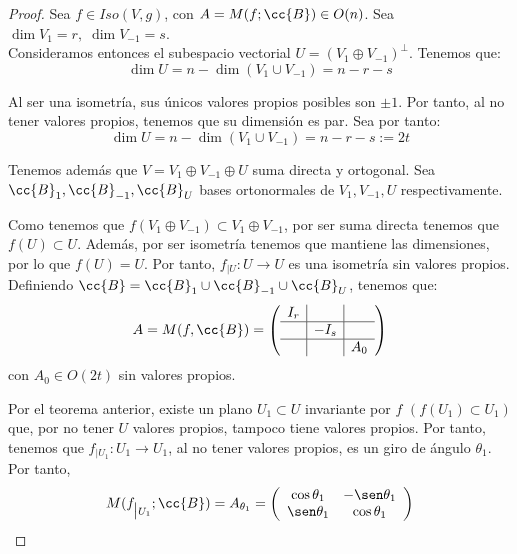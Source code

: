 \begin{proof}
Sea $f\in Iso(V,g)$, con $A=M(f;\cc{B})\in O(n)$. Sea $\dim V_1=r,\;\dim V_{-1}=s$.\\

Consideramos entonces el subespacio vectorial $U=(V_1\oplus V_{-1})^\perp$. Tenemos que:
\begin{equation*}
    \dim U = n - \dim (V_1\cup V_{-1}) = n-r-s
\end{equation*}

Al ser una isometría, sus únicos valores propios posibles son $\pm 1$. Por tanto, al no tener valores propios, tenemos que su dimensión es par. Sea por tanto:
\begin{equation*}
    \dim U = n - \dim (V_1\cup V_{-1}) = n-r-s := 2t
\end{equation*}

Tenemos además que $V=V_1 \oplus V_{-1} \oplus U$ suma directa y ortogonal. Sea $\cc{B}_1, \cc{B}_{-1}, \cc{B}_U$ bases ortonormales de $V_1, V_{-1}, U$ respectivamente.

Como tenemos que $f(V_1\oplus V_{-1})\subset V_1\oplus V_{-1}$, por ser suma directa tenemos que $f(U)\subset U$. Además, por ser isometría tenemos que mantiene las dimensiones, por lo que $f(U)=U$. Por tanto, $f_{\big|U}:U\to U$ es una isometría sin valores propios. Definiendo $\cc{B}=\cc{B}_1\cup \cc{B}_{-1}\cup \cc{B}_U$, tenemos que:
\begin{equation*}
    A=M(f,\cc{B}) = \left(\begin{array}{c|c|c}
                I_r &  \\ \hline
                 & -I_s \\ \hline
                 && A_0
            \end{array}\right)
\end{equation*}
con $A_0\in O(2t)$ sin valores propios.

Por el teorema anterior, existe un plano $U_1\subset U$ invariante por $f$ $(f(U_1)\subset U_1)$ que, por no tener $U$ valores propios, tampoco tiene valores propios. Por tanto, tenemos que $f_{\big| U_1}:U_1 \to U_1$, al no tener valores propios, es un giro de ángulo $\theta_1$. Por tanto,
\begin{equation*}
    M(f_{\big| U_1};\cc{B}) = A_{\theta_1}
    = \left(\begin{array}{ccc}
        \cos \theta_1 & -\sen \theta_1 \\
        \sen \theta_1 & \cos \theta_1
    \end{array}\right)
\end{equation*}


\end{proof}
